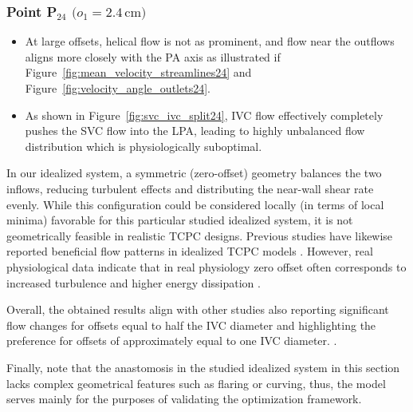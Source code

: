 \subsubsection*{Point P\(_{24}\) \(\bigl(o_1 = 2.4\,\mathrm{cm}\bigr)\)}
\begin{itemize}
	\item At large offsets, helical flow is not as prominent, and flow near the outflows aligns more closely with the PA axis as illustrated if Figure~\ref{fig:mean_velocity_streamlines24} and Figure~\ref{fig:velocity_angle_outlets24}.
	\item As shown in Figure~\ref{fig:svc_ivc_split24}, IVC flow effectively completely pushes the SVC flow into the LPA, leading to highly unbalanced flow distribution which is physiologically suboptimal.
\end{itemize}

In our idealized system, a symmetric (zero-offset) geometry balances the two inflows, reducing turbulent effects and distributing the near-wall shear rate evenly. While this configuration could be considered locally (in terms of local minima) favorable for this particular studied idealized system, it is not geometrically feasible in realistic TCPC designs. Previous studies have likewise reported beneficial flow patterns in idealized TCPC models \cite{Masters2004, Dubini1996}. However, real physiological data indicate that in real physiology zero offset often corresponds to increased turbulence and higher energy dissipation \cite{Sharma1996, Rijnberg2018, DeGroff2007, Amodeo2004}. 

Overall, the obtained results align with other studies also reporting significant flow changes for offsets equal to half the IVC diameter and highlighting the preference  for offsets of approximately equal to one IVC diameter. \cite{Sharma1996, Rijnberg2018, Pekkan2005}. 

Finally, note that the anastomosis in the studied idealized system in this section lacks complex geometrical features such as flaring or curving, thus, the model serves mainly for the purposes of validating the optimization framework.
